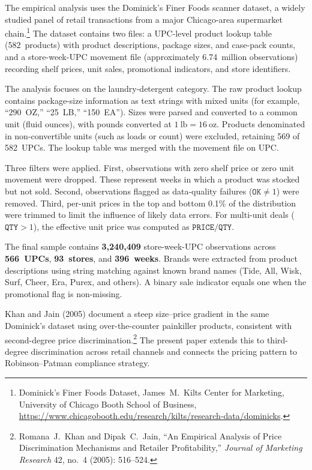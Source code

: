 \documentclass[12pt]{article}
\theoremstyle{definition}
\begin{document}
The empirical analysis uses the Dominick's Finer Foods scanner dataset, a widely studied panel of retail transactions from a major Chicago-area supermarket chain.\footnote{Dominick's Finer Foods Dataset, James~M.\ Kilts Center for Marketing, University of Chicago Booth School of Business, \url{https://www.chicagobooth.edu/research/kilts/research-data/dominicks}.}
The dataset contains two files: a UPC-level product lookup table (582~products) with product descriptions, package sizes, and case-pack counts, and a store-week-UPC movement file (approximately 6.74~million observations) recording shelf prices, unit sales, promotional indicators, and store identifiers.

The analysis focuses on the laundry-detergent category.
The raw product lookup contains package-size information as text strings with mixed units (for example, ``290~OZ,'' ``25~LB,'' ``150~EA'').
Sizes were parsed and converted to a common unit (fluid ounces), with pounds converted at $1~\text{lb} = 16~\text{oz}$.
Products denominated in non-convertible units (such as loads or count) were excluded, retaining 569 of 582~UPCs.
The lookup table was merged with the movement file on UPC.

Three filters were applied.
First, observations with zero shelf price or zero unit movement were dropped. These represent weeks in which a product was stocked but not sold.
Second, observations flagged as data-quality failures ($\texttt{OK} \ne 1$) were removed.
Third, per-unit prices in the top and bottom 0.1\% of the distribution were trimmed to limit the influence of likely data errors.
For multi-unit deals ($\texttt{QTY} > 1$), the effective unit price was computed as $\texttt{PRICE}/\texttt{QTY}$.

The final sample contains \textbf{3,240,409} store-week-UPC observations across \textbf{566~UPCs}, \textbf{93~stores}, and \textbf{396~weeks}.
Brands were extracted from product descriptions using string matching against known brand names (Tide, All, Wisk, Surf, Cheer, Era, Purex, and others).
A binary sale indicator equals one when the promotional flag is non-missing.

Khan and Jain (2005) document a steep size--price gradient in the same Dominick's dataset using over-the-counter painkiller products, consistent with second-degree price discrimination.\footnote{Romana~J.\ Khan and Dipak~C.\ Jain, ``An Empirical Analysis of Price Discrimination Mechanisms and Retailer Profitability,'' \textit{Journal of Marketing Research} 42, no.~4 (2005): 516--524.} The present paper extends this to third-degree discrimination across retail channels and connects the pricing pattern to Robinson--Patman compliance strategy.
\end{document}

